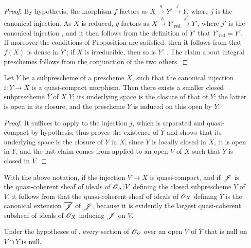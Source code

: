 \begin{proof}
\label{proof-1.9.5.9}
By hypothesis, the morphism $f$ factors as $X\xrightarrow{g}Y'\xrightarrow{j}Y$, where $j$ is the canonical injection.
As $X$ is reduced, $g$ factors as $X\xrightarrow{h} {Y'}_\text{red}\xrightarrow{j'}Y'$, where $j'$ is the canonical injection , and it then follows from the definition of $Y'$ that $Y'_\text{red}=Y'$.
If moreover the conditions of Proposition \sref[1.9.5.1] are satisfied, then it follows from  that $f(X)$ is dense in $Y'$; if $X$ is irreducible, then so is $Y'$ .
The claim about integral preschemes follows from the conjunction of the two others.
\end{proof}

\begin{prop}[9.5.10]
\label{1.9.5.10}
Let $Y$ be a subprescheme of a prescheme $X$, such that the canonical injection $i:Y\to X$ is a quasi-compact morphism.
Then there exists a smaller closed subprescheme $\overline{Y}$ of $X$  $Y$; its underlying space is the closure of that of $Y$; the latter is open in its closure, and the prescheme $Y$ is induced on this open by $\overline{Y}$.
\end{prop}

\begin{proof}
\label{proof-1.9.5.10}
It suffices to apply  to the injection $j$, which is separated  and quasi-compact by hypothesis;  thus proves the existence of $\overline{Y}$ and  shows that its underlying space is the closure of $Y$ in $X$; since $Y$ is locally closed in $X$, it is open in $\overline{Y}$, and the last claim comes from  applied to an open $V$ of $X$ such that $Y$ is closed in $V$.
\end{proof}

With the above notation, if the injection $V\to X$ is quasi-compact, and if $\mathscr{J}$ is the quasi-coherent sheaf of ideals of $\mathscr{O}_X|V$ defining the closed subprescheme $Y$ of $V$, it follows from  that the quasi-coherent sheaf of ideals of $\mathscr{O}_X$ defining $\overline{Y}$ is the canonical extension  $\overline{\mathscr{J}}$ of $\mathscr{J}$, because it is evidently the largest quasi-coherent subsheaf of ideals of $\mathscr{O}_X$ inducing $\mathscr{J}$ on $V$.

\begin{cor}[9.5.11]
\label{1.9.5.11}
Under the hypotheses of , every section of $\mathscr{O}_{\overline{Y}}$ over an open $V$ of $\overline{Y}$ that is null on $V\cap Y$ is null.
\end{cor}


